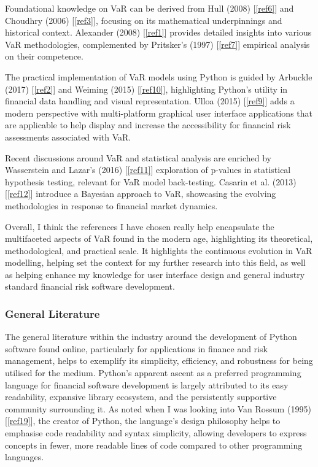 \documentclass{article}
\begin{document}
Foundational knowledge on VaR can be derived from Hull (2008) [\ref{ref6}] and Choudhry (2006) [\ref{ref3}], focusing on its mathematical underpinnings and historical context. Alexander (2008) [\ref{ref1}] provides detailed insights into various VaR methodologies, complemented by Pritsker's (1997) [\ref{ref7}] empirical analysis on their competence.\\\vspace{0.3cm}

The practical implementation of VaR models using Python is guided by Arbuckle (2017) [\ref{ref2}] and Weiming (2015) [\ref{ref10}], highlighting Python's utility in financial data handling and visual representation. Ulloa (2015) [\ref{ref9}]  adds a modern perspective with multi-platform graphical user interface applications that are applicable to help display and increase the accessibility for financial risk assessments associated with VaR.\\\vspace{0.3cm}

Recent discussions around VaR and statistical analysis are enriched by Wasserstein and Lazar's (2016) [\ref{ref11}] exploration of p-values in statistical hypothesis testing, relevant for VaR model back-testing. Casarin et al. (2013) [\ref{ref12}] introduce a Bayesian approach to VaR, showcasing the evolving methodologies in response to financial market dynamics.\\\vspace{0.3cm}

Overall, I think the references I have chosen really help encapsulate the multifaceted aspects of VaR found in the modern age, highlighting its theoretical, methodological, and practical scale. It highlights the continuous evolution in VaR modelling, helping set the context for my further research into this field, as well as helping enhance my knowledge for user interface design and general industry standard financial risk software development.

\subsubsection{General Literature}

The general literature within the industry around the development of Python software found online, particularly for applications in finance and risk management, helps to exemplify its simplicity, efficiency, and robustness for being utilised for the medium. Python's apparent ascent as a preferred programming language for financial software development is largely attributed to its easy readability, expansive library ecosystem, and the persistently supportive community surrounding it. As noted when I was looking into Van Rossum (1995) [\ref{ref19}], the creator of Python, the language's design philosophy helps to emphasise code readability and syntax simplicity, allowing developers to express concepts in fewer, more readable lines of code compared to other programming languages.\\\vspace{0.3cm}
\end{document}
